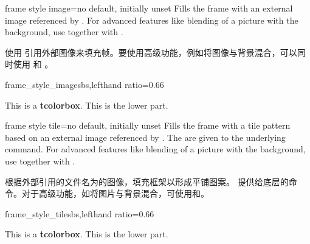 \begin{docTcbKey}{frame style image}{=}{no default, initially unset}
Fills the frame with an external image referenced by .
For advanced features like blending of a picture with the background,
use  together with .

使用  引用外部图像来填充帧。要使用高级功能，例如将图像与背景混合，可以同时使用  和 。
\begin{exdispExample*}{frame_style_image}{sbs,lefthand ratio=0.66}

\begin{tcolorbox}[enhanced,title=My title,
  frame style image=blueshade.png]
This is a \textbf{tcolorbox}.
\tcblower
This is the lower part.
\end{tcolorbox}
\end{exdispExample*}
\end{docTcbKey}

\begin{docTcbKey}{frame style tile}{=}{no default, initially unset}
Fills the frame with a tile pattern based on an external image referenced by .
The  are given to the underlying  command.
For advanced features like blending of a picture with the background,
use  together with .

根据外部引用的文件名为的图像，填充框架以形成平铺图案。 提供给底层的命令。对于高级功能，如将图片与背景混合，可使用和。
\begin{exdispExample*}{frame_style_tile}{sbs,lefthand ratio=0.66}

\begin{tcolorbox}[enhanced,title=My title,
  frame style tile={width=1cm}{pink_marble.png}]
This is a \textbf{tcolorbox}.
\tcblower
This is the lower part.
\end{tcolorbox}
\end{exdispExample*}
\end{docTcbKey}

